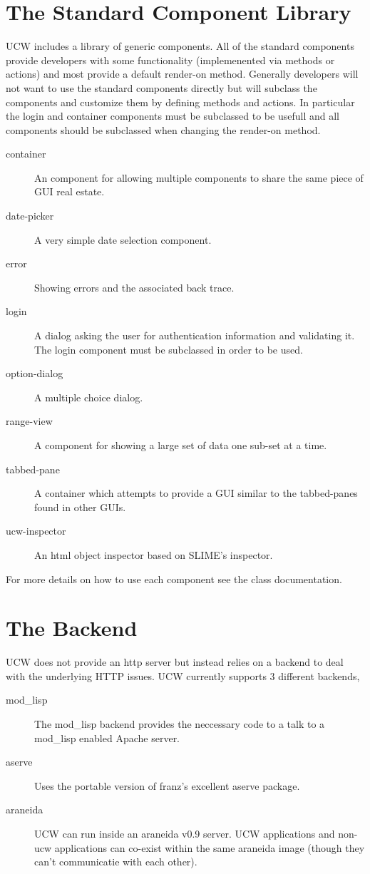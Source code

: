 \documentclass[a4paper]{article}
\newcommand{\ucw}{\textsc{UCW}}
\begin{document}
\section{The Standard Component Library}

\ucw{} includes a library of generic components. All of the standard
components provide developers with some functionality (implemenented
via methods or actions) and most provide a default render-on method.
Generally developers will not want to use the standard components
directly but will subclass the components and customize them by
defining methods and actions. In particular the login and container
components must be subclassed to be usefull and all components should
be subclassed when changing the render-on method.

\begin{description}
\item[container] An component for allowing multiple components to
  share the same piece of GUI real estate.
\item[date-picker] A very simple date selection component.
\item[error] Showing errors and the associated back trace.
\item[login] A dialog asking the user for authentication information
  and validating it. The login component must be subclassed in order
  to be used.
\item[option-dialog] A multiple choice dialog.
\item[range-view] A component for showing a large set of data one
  sub-set at a time.
\item[tabbed-pane] A container which attempts to provide a GUI similar
  to the tabbed-panes found in other GUIs.
\item[ucw-inspector] An html object inspector based on SLIME's
  inspector.
\end{description}

For more details on how to use each component see the class
documentation.

\section{The Backend}

\ucw{} does not provide an http server but instead relies on a backend
to deal with the underlying HTTP issues. \ucw{} currently supports 3
different backends,

\begin{description}
\item[mod\_lisp] The mod\_lisp backend provides the neccessary code to
  a talk to a mod\_lisp enabled Apache server.
\item[aserve] Uses the portable version of franz's excellent aserve
  package.
\item[araneida] UCW can run inside an araneida v0.9 server. UCW
  applications and non-ucw applications can co-exist within the same
  araneida image (though they can't communicatie with each other).
\end{description}
\end{document}
